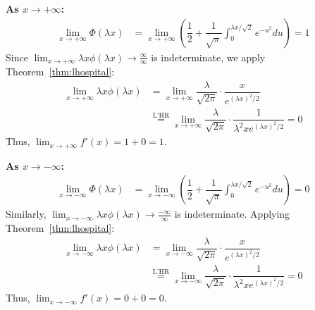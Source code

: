 \documentclass[11pt]{article}
\begin{document}
\noindent \textbf{As $x \rightarrow +\infty$:}
\begin{equation*}
\begin{aligned}
\lim_{x \rightarrow +\infty}\Phi(\lambda x) &= \lim_{x \rightarrow +\infty}\left(\dfrac{1}{2} + \dfrac{1}{\sqrt{\pi}}\int_{0}^{\lambda x/\sqrt{2}}e^{-u^{2}}du\right) = 1
\end{aligned}
\end{equation*}
Since $\displaystyle\lim_{x \rightarrow +\infty} \lambda x\phi(\lambda x) \rightarrow \frac{\infty}{\infty}$ is indeterminate, we apply Theorem~\ref{thm:lhospital}:
\begin{equation*}
\begin{aligned}
\lim_{x \rightarrow +\infty} \lambda x\phi(\lambda x) &= \lim_{x \rightarrow +\infty} \dfrac{\lambda}{\sqrt{2\pi}}\cdot\dfrac{x}{e^{(\lambda x)^2 / 2}}\\ 
&\overset{\text{L'HR}}{=} \lim_{x \rightarrow +\infty} \dfrac{\lambda}{\sqrt{2\pi}}\cdot\dfrac{1}{\lambda^2 x e^{(\lambda x)^2 / 2}} = 0
\end{aligned}
\end{equation*}
Thus, $\displaystyle\lim_{x \to +\infty} f'(x) = 1 + 0 = 1$.

\vspace{0.5cm}

\noindent \textbf{As $x \rightarrow -\infty$:}
\begin{equation*}
\begin{aligned}
\lim_{x \rightarrow -\infty}\Phi(\lambda x) &= \lim_{x \rightarrow -\infty}\left(\dfrac{1}{2} + \dfrac{1}{\sqrt{\pi}}\int_{0}^{\lambda x/\sqrt{2}}e^{-u^{2}}du\right) = 0
\end{aligned}
\end{equation*}
Similarly, $\displaystyle\lim_{x \rightarrow -\infty} \lambda x\phi(\lambda x) \rightarrow \frac{-\infty}{\infty}$ is indeterminate. Applying Theorem~\ref{thm:lhospital}:
\begin{equation*}
\begin{aligned}
\lim_{x \rightarrow -\infty} \lambda x\phi(\lambda x) &= \lim_{x \rightarrow -\infty} \dfrac{\lambda}{\sqrt{2\pi}}\cdot\dfrac{x}{e^{(\lambda x)^2 / 2}}\\ 
&\overset{\text{L'HR}}{=} \lim_{x \rightarrow -\infty} \dfrac{\lambda}{\sqrt{2\pi}}\cdot\dfrac{1}{\lambda^2 x e^{(\lambda x)^2 / 2}} = 0
\end{aligned}
\end{equation*}
Thus, $\displaystyle\lim_{x \to -\infty} f'(x) = 0 + 0 = 0$.
\end{document}
